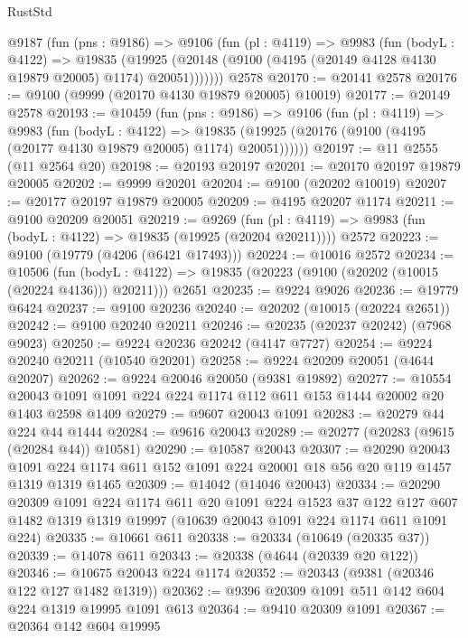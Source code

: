\begin{lexlean}{RustStd}
\begin{coremodule}
    @9187
      (fun (pns : @9186) =>
      @9106
        (fun (pl : @4119) =>
        @9983
          (fun (bodyL : @4122) =>
          @19835
            (@19925 (@20148 (@9100 (@4195 (@20149 @4128 @4130 @19879 @20005) @1174) @20051)))))))
    @2578
@20170 := @20141 @2578
@20176 := @9100 (@9999 (@20170 @4130 @19879 @20005) @10019)
@20177 := @20149 @2578
@20193 := @10459
    (fun (pns : @9186) =>
    @9106
      (fun (pl : @4119) =>
      @9983
        (fun (bodyL : @4122) =>
        @19835 (@19925 (@20176 (@9100 (@4195 (@20177 @4130 @19879 @20005) @1174) @20051))))))
@20197 := @11 @2555 (@11 @2564 @20)
@20198 := @20193 @20197
@20201 := @20170 @20197 @19879 @20005
@20202 := @9999 @20201
@20204 := @9100 (@20202 @10019)
@20207 := @20177 @20197 @19879 @20005
@20209 := @4195 @20207 @1174
@20211 := @9100 @20209 @20051
@20219 := @9269
    (fun (pl : @4119) => @9983 (fun (bodyL : @4122) => @19835 (@19925 (@20204 @20211))))
    @2572
@20223 := @9100 (@19779 (@4206 (@6421 @17493)))
@20224 := @10016 @2572
@20234 := @10506
    (fun (bodyL : @4122) => @19835 (@20223 (@9100 (@20202 (@10015 (@20224 @4136))) @20211)))
    @2651
@20235 := @9224 @9026
@20236 := @19779 @6424
@20237 := @9100 @20236
@20240 := @20202 (@10015 (@20224 @2651))
@20242 := @9100 @20240 @20211
@20246 := @20235 (@20237 @20242) (@7968 @9023)
@20250 := @9224 @20236 @20242 (@4147 @7727)
@20254 := @9224 @20240 @20211 (@10540 @20201)
@20258 := @9224 @20209 @20051 (@4644 @20207)
@20262 := @9224 @20046 @20050 (@9381 @19892)
@20277 := @10554
    @20043
    @1091
    @1091
    @224
    @224
    @1174
    @112
    @611
    @153
    @1444
    @20002
    @20
    @1403
    @2598
    @1409
@20279 := @9607 @20043 @1091
@20283 := @20279 @44 @224 @44 @1444
@20284 := @9616 @20043
@20289 := @20277 (@20283 (@9615 (@20284 @44)) @10581)
@20290 := @10587 @20043
@20307 := @20290
    @20043
    @1091
    @224
    @1174
    @611
    @152
    @1091
    @224
    @20001
    @18
    @56
    @20
    @119
    @1457
    @1319
    @1319
    @1465
@20309 := @14042 (@14046 @20043)
@20334 := @20290
    @20309
    @1091
    @224
    @1174
    @611
    @20
    @1091
    @224
    @1523
    @37
    @122
    @127
    @607
    @1482
    @1319
    @1319
    @19997
    (@10639 @20043 @1091 @224 @1174 @611 @1091 @224)
@20335 := @10661 @611
@20338 := @20334 (@10649 (@20335 @37))
@20339 := @14078 @611
@20343 := @20338 (@4644 (@20339 @20 @122))
@20346 := @10675 @20043 @224 @1174
@20352 := @20343 (@9381 (@20346 @122 @127 @1482 @1319))
@20362 := @9396 @20309 @1091 @511 @142 @604 @224 @1319 @19995 @1091 @613
@20364 := @9410 @20309 @1091
@20367 := @20364 @142 @604 @19995

\end{coremodule}
\end{lexlean}
